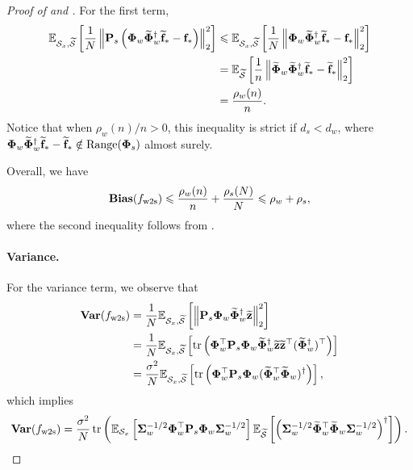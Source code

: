 \begin{proof}[Proof of  and ]
    For the first term, 
    \begin{align*}
        \E_{\Scal_x, \wt\Scal}\sbr{\frac{1}{N} \nbr{\Pb_s \rbr{\Phib_w \wt\Phib_w^\dagger \wt\fb_* - \fb_*}}_2^2} &\le \E_{\Scal_x, \wt\Scal}\sbr{\frac{1}{N} \nbr{\Phib_w \wt\Phib_w^\dagger \wt\fb_* - \fb_*}_2^2} \\
        &= \E_{\wt\Scal}\sbr{\frac{1}{n} \nbr{\wt\Phib_w \wt\Phib_w^\dagger \wt\fb_* - \wt\fb_*}_2^2} \\
        &= \frac{\rho_w(n)}{n}.
    \end{align*}
    Notice that when ${\rho_w(n)}/{n} > 0$, this inequality is strict if $d_s < d_w$, where $\Phib_w \wt\Phib_w^\dagger \wt\fb_* - \wt\fb_* \notin \range(\Phib_s)$ almost surely.

    Overall, we have
    \begin{align*}
        \bias(f_\wts) \le \frac{\rho_w(n)}{n} + \frac{\rho_s(N)}{N} \le \rho_w + \rho_s,
    \end{align*}
    where the second inequality follows from .

    \paragraph{Variance.}
    For the variance term, we observe that
    \begin{align*}
    \begin{split}
        \vari(f_\wts) &= \frac{1}{N} \E_{\Scal_x, \wt\Scal}\sbr{\nbr{\Pb_s \Phib_w \wt\Phib_w^\dagger \wt\zb}_2^2} \\
        &= \frac{1}{N} \E_{\Scal_x, \wt\Scal}\sbr{\tr\rbr{\Phib_w^\top \Pb_s \Phib_w \wt\Phib_w^\dagger \wt\zb \wt\zb^\top (\wt\Phib_w^\dagger)^\top}} \\
        &= \frac{\sigma^2}{N} \E_{\Scal_x, \wt\Scal}\sbr{\tr\rbr{\Phib_w^\top \Pb_s \Phib_w (\wt\Phib_w^\top \wt\Phib_w)^\dagger}},
    \end{split}
    \end{align*}
    which implies
    \begin{align}\label{eq:pf_var_w2s}
    \begin{split}
        \vari(f_\wts) = \frac{\sigma^2}{N} \tr\rbr{\E_{\Scal_x}\sbr{\Sigmab_w^{-1/2} \Phib_w^\top \Pb_s \Phib_w \Sigmab_w^{-1/2}} \E_{\wt\Scal}\sbr{\rbr{\Sigmab_w^{-1/2} \wt\Phib_w^\top \wt\Phib_w \Sigmab_w^{-1/2}}^\dagger}}.
    \end{split}
    \end{align}


\end{proof}
